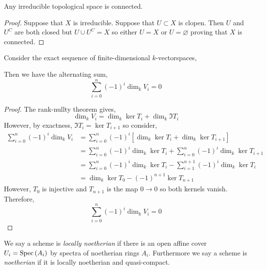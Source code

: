 \documentclass[12pt]{article}
\begin{document}
\begin{lemma} \label{irreducible_implies_connected}
Any irreducible topological space is connected.
\end{lemma}

\begin{proof}
Suppose that $X$ is irreducible. Suppose that $U \subset X$ is clopen. Then $U$ and $U^C$ are both closed but $U \cup U^C = X$ so either $U = X$ or $U = \varnothing$ proving that $X$ is connected. 
\end{proof}



\begin{lemma} \label{alt_sum_exact}
Consider the exact sequence of finite-dimensional $k$-vectorspaces,
\begin{center}
\end{center}
Then we have the alternating sum,
\[ \sum_{i = 0}^n (-1)^i \dim_k V_i = 0 \]
\end{lemma}

\begin{proof}
The rank-nullty theorem gives,
\[ \dim_k{V_i} = \dim_k{\ker{T_i}} + \dim_k{\Im{T_i}} \]
However, by exactness, $\Im{T_i} = \ker{T_{i+1}}$ so consider,
\begin{align*}
\sum_{i = 0}^n (-1)^i \dim_k V_i & = \sum_{i = 0}^n (-1)^i \left[ \dim_k{\ker{T_i}} + \dim_k{\ker{T_{i + 1}}} \right]
\\
& = \sum_{i = 0}^n (-1)^i  \dim_k{\ker{T_i}} + \sum_{i = 0}^{n} (-1)^i  \dim_k{\ker{T_{i+1}}} 
\\
& = \sum_{i = 0}^n (-1)^i  \dim_k{\ker{T_i}} - \sum_{i = 1}^{n+1} (-1)^i  \dim_k{\ker{T_{i}}}
\\
& = \dim_k{\ker{T_0}} - (-1)^{n+1} \ker{T_{n+1}}
\end{align*}
However, $T_0$ is injective and $T_{n+1}$ is the map $0 \to 0$ so both kernels vanish. Therefore,
\[ \sum_{i = 0}^n (-1)^i \dim_k V_i = 0 \]
\end{proof}

\begin{definition}
We say a scheme is \textit{locally noetherian} if there is an open affine cover $U_i = \mathrm{Spec}\left( A_i \right)$ by spectra of noetherian rings $A_i$. Furthermore we say a scheme is \textit{noetherian} if it is locally noetherian and quasi-compact.
\end{definition}
\end{document}
